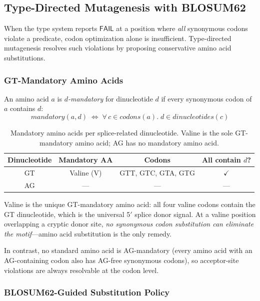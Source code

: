 \documentclass[acmsmall,review,anonymous]{acmart}
\newcommand{\FAIL}{\ensuremath{\mathsf{FAIL}}\xspace}
\begin{document}
\subsection{Type-Directed Mutagenesis with BLOSUM62}\label{sec:mut}

When the type system reports \FAIL{} at a position where \emph{all}
synonymous codons violate a predicate, codon optimization alone is
insufficient.
Type-directed mutagenesis resolves such violations by proposing
conservative amino acid substitutions.

\subsubsection{GT-Mandatory Amino Acids}

\begin{definition}
An amino acid $a$ is \emph{$d$-mandatory} for dinucleotide $d$ if
every synonymous codon of $a$ contains $d$:
\[
  \mathit{mandatory}(a, d) \;\iff\;
  \forall\, c \in \mathit{codons}(a).\; d \in \mathit{dinucleotides}(c)
\]
\end{definition}

\begin{table}[t]
\centering
\caption{Mandatory amino acids per splice-related dinucleotide.
         Valine is the sole GT-mandatory amino acid;
         AG has no mandatory amino acid.}
\label{tab:mandatory}
\begin{tabular}{cccc}
\toprule
\textbf{Dinucleotide} & \textbf{Mandatory AA} & \textbf{Codons} &
  \textbf{All contain $d$?} \\
\midrule
GT & Valine (V) & GTT, GTC, GTA, GTG & $\checkmark$ \\
AG & --- & --- & --- \\
\bottomrule
\end{tabular}
\end{table}

Valine is the unique GT-mandatory amino acid: all four valine codons
contain the GT dinucleotide, which is the universal 5$'$ splice donor
signal.
At a valine position overlapping a cryptic donor site, \emph{no
synonymous codon substitution can eliminate the motif}---amino acid
substitution is the only remedy.

In contrast, no standard amino acid is AG-mandatory (every amino acid
with an AG-containing codon also has AG-free synonymous codons), so
acceptor-site violations are always resolvable at the codon level.

\subsubsection{BLOSUM62-Guided Substitution Policy}
\end{document}
